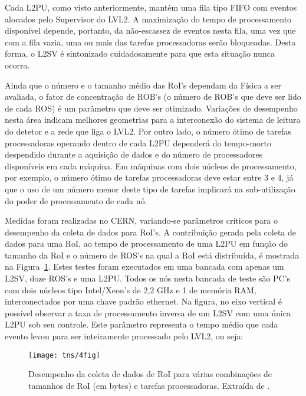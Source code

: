 Cada L2PU, como visto anteriormente, mantém uma fila tipo FIFO com eventos
alocados pelo Supervisor do LVL2. A maximização do tempo de processamento
disponível depende, portanto, da não-escassez de eventos nesta fila, uma vez
que com a fila vazia, uma ou mais das tarefas processadoras serão
bloqueadas. Desta forma, o L2SV é sintonizado cuidadosamente para que esta
situação nunca ocorra.

Ainda que o número e o tamanho médio das RoI's dependam da Física a ser
avaliada, o fator de concentração de ROB's (o número de ROB's que deve ser
lido de cada ROS) é um parâmetro que deve ser otimizado. Variações de
desempenho nesta área indicam melhores geometrias para a interconexão do
sistema de leitura do detetor e a rede que liga o LVL2. Por outro lado, o
número ótimo de tarefas processadoras operando dentro de cada L2PU dependerá
do tempo-morto despendido durante a aquisição de dados e do número de
processadores disponíveis em cada máquina. Em máquinas com dois núcleos de
processamento, por exemplo, o número ótimo de tarefas processadoras deve estar
entre 3 e 4, já que o uso de um número menor deste tipo de tarefas implicará
na sub-utilização do poder de processamento de cada nó.

Medidas foram realizadas no CERN, variando-se parâmetros críticos para o
desempenho da coleta de dados para RoI's. A contribuição gerada pela coleta
de dados para uma RoI, ao tempo de processamento de uma L2PU em função do
tamanho da RoI e o número de ROS's na qual a RoI está distribuída, é mostrada
na Figura~\ref{fig:tns-4fig}. Estes testes foram executados em uma bancada com
apenas um L2SV, doze ROS's e uma L2PU. Todos os nós nesta bancada de teste são
PC's com dois núcleos tipo Intel/Xeon's de 2,2 GHz e 1  de
memória RAM, interconectados por uma chave padrão  ethernet. Na
figura, no eixo vertical é possível observar a taxa de processamento inversa
de um L2SV com uma única L2PU sob seu controle. Este parâmetro representa o
tempo médio que cada evento levou para ser inteiramente processado pelo LVL2,
ou seja:

\begin{figure}
\begin{center}
\texttt{[image: tns/4fig]}
\end{center}
\caption{Desempenho da coleta de dados de RoI para várias combinações de
tamanhos de RoI (em bytes) e tarefas processadoras. Extraída de
\cite{aa:tns-2004}.}
\label{fig:tns-4fig}
\end{figure}

